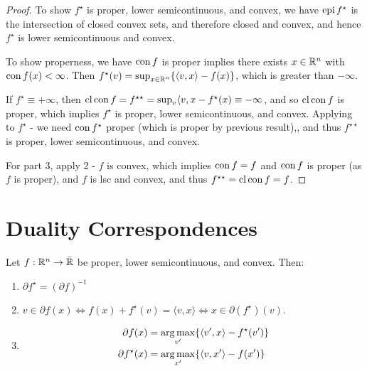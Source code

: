 \begin{proof}
  To show $f^{\star}$ is proper, lower semicontinuous, and convex, we
  have $\operatorname*{epi} f^{\star}$ is the intersection of closed convex sets, and
  therefore closed and convex, and hence $f^{\star}$ is lower
  semicontinuous and convex.

  To show properness, we have $\operatorname*{con} f$ is proper implies there exists
  $x \in \mathbb{R}^{n}$ with $\operatorname*{con} f(x) < \infty$. Then $f^{\star}(v) =
  \sup_{x \in \mathbb{R}^{n}} \{ \langle v, x \rangle - f(x) \}$, which is
  greater than $-\infty$.

  If $f^{\star} \equiv +\infty$, then $\operatorname*{cl} \operatorname*{con} f = f^{\star \star} =
  \sup_{v} \langle v, x - f^{\star}(x) \equiv -\infty$, and so $\operatorname*{cl}
  \operatorname*{con} f$ is proper, which implies $f^{\star}$ is proper, lower
  semicontinuous, and convex. Applying to $f^{\star}$ - we need $\operatorname*{con}
  f^{\star}$ proper (which is proper by previous result),, and thus
  $f^{\star \star}$ is proper, lower semicontinuous, and convex.

  For part 3, apply 2 - $f$ is convex, which implies $\operatorname*{con} f = f$ and
  $\operatorname*{con} f$ is proper (as $f$ is proper), and $f$ is lsc and convex,
  and thus $f^{\star \star} = \operatorname*{cl} \operatorname*{con} f = f$.
\end{proof}


\section{Duality Correspondences}
\label{sec:dual-corr}

\begin{thm}
  \label{defn:conjugate_functions:7}
  Let $f: \mathbb{R}^{n} \rightarrow \bar {\mathbb{R}}$ be proper, lower semicontinuous,
  and convex. Then:
  \begin{enumerate}
  \item $\partial f^{\star} = (\partial f)^{-1}$
  \item $v \in \partial f(x) \iff f(x) + f^{\star}(v) = \langle v, x
    \rangle \iff x \in \partial (f^{\star})(v)$.
  \item
    \begin{align}
      \label{eq:58}
      \partial f(x) &= \operatorname*{arg\,max}_{v'} \{ \langle v', x \rangle - f^{\star}(v') \}  \\
      \partial f^{\star}(x) &= \operatorname*{arg\,max}_{x'} \{ \langle v, x' \rangle - f(x') \}  \\
    \end{align}

  \end{enumerate}
\end{thm}

